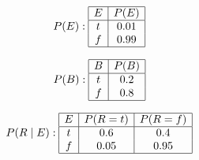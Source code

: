 \begin{figure}[htp!]
\begin{center}
\begin{minipage}{0.3\textwidth}
\[
P(E) :
\begin{array}{|c|c|}
\hline
E & P(E) \\
\hline
t & 0.01 \\
f & 0.99 \\
\hline
\end{array}
\]
\end{minipage}%
\begin{minipage}{0.3\textwidth}
\[
P(B) :
\begin{array}{|c|c|}
\hline
B & P(B) \\
\hline
t & 0.2 \\
f & 0.8 \\
\hline
\end{array}
\]
\end{minipage}%
\begin{minipage}{0.35\textwidth}
\[
P(R \mid E) :
\begin{array}{|c|c|c|}
\hline
E & P(R = t) & P(R = f) \\
\hline
t & 0.6 & 0.4 \\
f & 0.05 & 0.95 \\
\hline
\end{array}
\]
\end{minipage}%



\end{center}
\end{figure}
